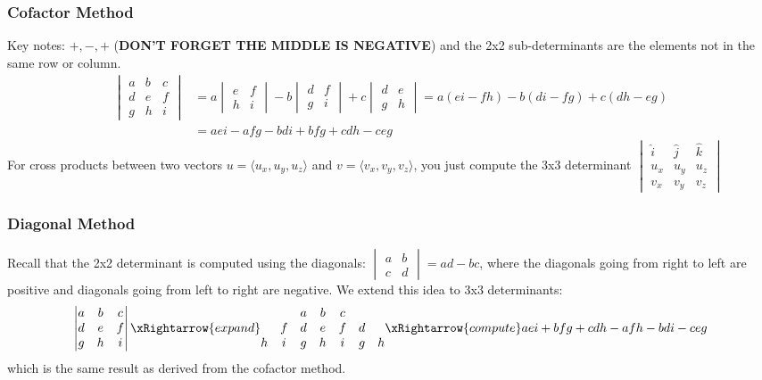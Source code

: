 \documentclass[]{mangos-musings}
\begin{document}
\subsubsection*{Cofactor Method}
Key notes: $+, -, +$ (\textbf{DON'T FORGET THE MIDDLE IS NEGATIVE}) and the 2x2 sub-determinants are the elements not in the same row or column.
\begin{align*}
  \begin{vmatrix}
    a & b & c \\
    d & e & f \\ 
    g & h & i
  \end{vmatrix}
  &= a \begin{vmatrix}
    e & f \\ 
    h & i
  \end{vmatrix}
  - b \begin{vmatrix}
    d & f \\ 
    g & i
  \end{vmatrix}
  + c \begin{vmatrix}
    d & e \\ 
    g & h
  \end{vmatrix}
  = a(ei - fh) - b(di - fg) + c(dh - eg)
  \\ &= aei - afg - bdi + bfg + cdh - ceg
\end{align*}
For cross products between two vectors $u = \langle u_x, u_y, u_z \rangle$ and $v = \langle v_x, v_y, v_z \rangle$, you just compute the 3x3 determinant $\begin{vmatrix}
  \hat{i} & \hat{j} & \hat{k} \\ 
  u_x & u_y & u_z \\ 
  v_x & v_y & v_z
\end{vmatrix}$

\subsubsection*{Diagonal Method}
Recall that the 2x2 determinant is computed using the diagonals:
$\begin{vmatrix}
    a & b \\
    c & d 
\end{vmatrix} = ad - bc$, where the diagonals going from right to left are positive and diagonals going from left to right are negative. We extend this idea to 3x3 determinants:
\[\begin{vmatrix}
    a & b & c \\
    d & e & f \\ 
    g & h & i
  \end{vmatrix} \xRightarrow{expand} \begin{matrix}
    & & a & b & c & & \\
    & f & d & e & f & d & \\ 
    h & i & g & h & i & g & h
  \end{matrix} \xRightarrow{compute} aei + bfg + cdh - afh - bdi - ceg\]
which is the same result as derived from the cofactor method.
\end{document}
